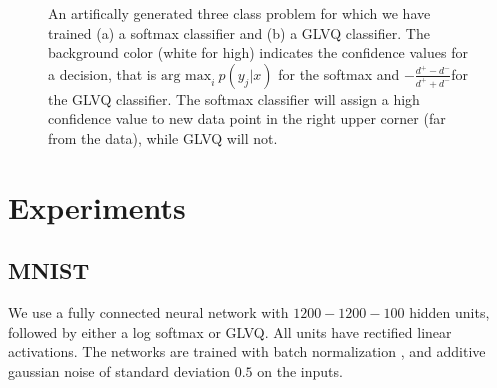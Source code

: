 \documentclass{esannV2}
\begin{document}
\begin{figure}[t]
\caption{An artifically generated three class problem for which we have trained (a) a softmax classifier and (b) a GLVQ classifier. The background color (white for high) indicates the confidence values for a decision, that is $\mbox{arg max}_i\ p(y_j|x)$ for the softmax and $-\frac{d^{+} - d^{-}}{d^{+} + d^{-}}$\protect\footnotemark for the GLVQ classifier. The softmax classifier will assign a high confidence value to new data point in the right upper corner (far from the data), while GLVQ will not. }
\label{figure:diff_glvq_softmax}
\end{figure}



\section{Experiments}
\subsection{MNIST}
We use a fully connected neural network with $1200-1200-100$ hidden units, followed by either a log softmax or GLVQ. All units have rectified linear activations. The networks are trained with batch normalization \cite{DBLP:journals/corr/IoffeS15}, and additive gaussian noise of standard deviation $0.5$ on the inputs. 
\end{document}
